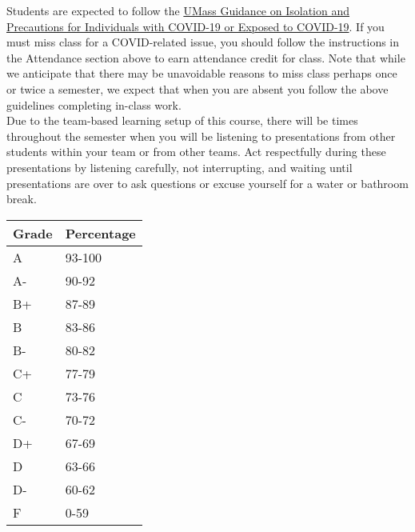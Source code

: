 \documentclass[10pt]{article}
\begin{document}
 Students are expected to follow the \href{https://www.umass.edu/coronavirus/isolation-and-quarantine-guide}{UMass Guidance on Isolation and Precautions for Individuals with COVID-19 or Exposed to COVID-19}. If you must miss class for a COVID-related issue, you should follow the instructions in the Attendance section above to earn attendance credit for class. Note that while we anticipate that there may be unavoidable reasons to miss class perhaps once or twice a semester, we expect that when you are absent you follow the above guidelines completing in-class work. \\


 Due to the team-based learning setup of this course, there will be times throughout the semester when you will be listening to presentations from other students within your team or from other teams. Act respectfully during these presentations by listening carefully, not interrupting, and waiting until presentations are over to ask questions or excuse yourself for a water or bathroom break.\\

%
%
\begin{table}[htp]
\begin{tabular}{ll}
Grade & Percentage \\
\hline
A & 93-100 \\
A- & 90-92 \\
B+ & 87-89 \\
B & 83-86 \\
B- & 80-82 \\
C+ & 77-79 \\
C & 73-76 \\
C- & 70-72 \\
D+ & 67-69 \\
D & 63-66 \\
D- & 60-62\\
F & 0-59 \\
\end{tabular}
\end{table}%
\end{document}
